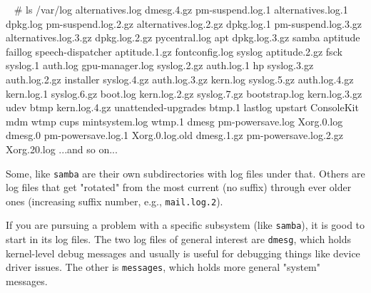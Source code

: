 \documentclass[10pt,american,]{book}
\newenvironment{Shaded}{\begin{snugshade}}{\end{snugshade}}
\newcommand{\KeywordTok}[1]{\textcolor[rgb]{0.13,0.29,0.53}{\textbf{{#1}}}}
\newcommand{\CommentTok}[1]{\textcolor[rgb]{0.56,0.35,0.01}{\textit{{#1}}}}
\newcommand{\NormalTok}[1]{{#1}}
\numberwithin{figure}{chapter}
\renewcommand{\KeywordTok}[1]{{#1}}
\renewcommand{\CommentTok}[1]{{#1}}
\renewcommand{\NormalTok}[1]{{#1}}
\begin{document}
\begin{Shaded}
\begin{Highlighting}[]
\KeywordTok{~} \CommentTok{# ls /var/log}
\KeywordTok{alternatives.log}       \NormalTok{dmesg.4.gz             pm-suspend.log.1}
\KeywordTok{alternatives.log.1}     \NormalTok{dpkg.log               pm-suspend.log.2.gz}
\KeywordTok{alternatives.log.2.gz}  \NormalTok{dpkg.log.1             pm-suspend.log.3.gz}
\KeywordTok{alternatives.log.3.gz}  \NormalTok{dpkg.log.2.gz          pycentral.log}
\KeywordTok{apt}                    \NormalTok{dpkg.log.3.gz          samba}
\KeywordTok{aptitude}               \NormalTok{faillog                speech-dispatcher}
\KeywordTok{aptitude.1.gz}          \NormalTok{fontconfig.log         syslog}
\KeywordTok{aptitude.2.gz}          \NormalTok{fsck                   syslog.1}
\KeywordTok{auth.log}               \NormalTok{gpu-manager.log        syslog.2.gz}
\KeywordTok{auth.log.1}             \NormalTok{hp                     syslog.3.gz}
\KeywordTok{auth.log.2.gz}          \NormalTok{installer              syslog.4.gz}
\KeywordTok{auth.log.3.gz}          \NormalTok{kern.log               syslog.5.gz}
\KeywordTok{auth.log.4.gz}          \NormalTok{kern.log.1             syslog.6.gz}
\KeywordTok{boot.log}               \NormalTok{kern.log.2.gz          syslog.7.gz}
\KeywordTok{bootstrap.log}          \NormalTok{kern.log.3.gz          udev}
\KeywordTok{btmp}                   \NormalTok{kern.log.4.gz          unattended-upgrades}
\KeywordTok{btmp.1}                 \NormalTok{lastlog                upstart}
\KeywordTok{ConsoleKit}             \NormalTok{mdm                    wtmp}
\KeywordTok{cups}                   \NormalTok{mintsystem.log         wtmp.1}
\KeywordTok{dmesg}                  \NormalTok{pm-powersave.log       Xorg.0.log}
\KeywordTok{dmesg.0}                \NormalTok{pm-powersave.log.1     Xorg.0.log.old}
\KeywordTok{dmesg.1.gz}             \NormalTok{pm-powersave.log.2.gz  Xorg.20.log}
\KeywordTok{...and} \NormalTok{so on...}
\end{Highlighting}
\end{Shaded}

Some, like \texttt{samba} are their own subdirectories with log files
under that. Others are log files that get "rotated" from the most
current (no suffix) through ever older ones (increasing suffix number,
e.g., \texttt{mail.log.2}).

If you are pursuing a problem with a specific subsystem (like
\texttt{samba}), it is good to start in its log files. The two log files
of general interest are \texttt{dmesg},
 which holds
kernel-level debug messages and usually is useful for debugging things
like device driver issues. The other is \texttt{messages},
 which
holds more general "system" messages.
\end{document}
